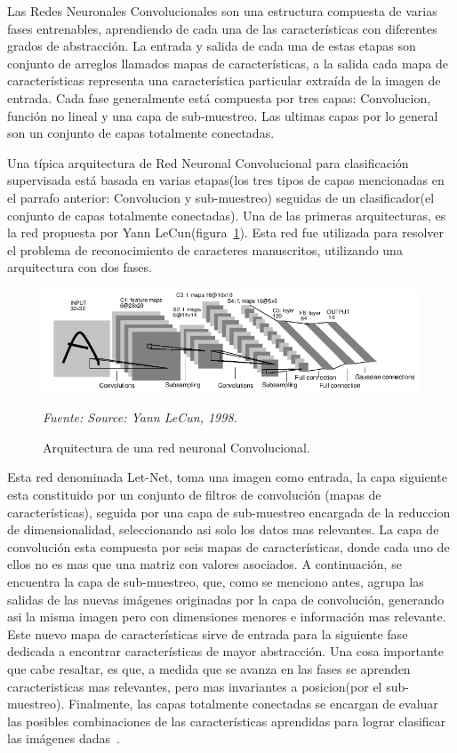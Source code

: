 Las Redes Neuronales Convolucionales son una estructura compuesta de varias fases entrenables, aprendiendo de cada una de las características con diferentes grados de abstracción. La entrada y salida de cada una de estas etapas son conjunto de arreglos llamados mapas de características, a la salida cada mapa de características representa una característica particular extraída de la imagen de entrada. Cada fase generalmente está compuesta por tres capas: Convolucion, función no lineal y una capa de sub-muestreo. Las ultimas capas por lo general son un conjunto de capas totalmente conectadas.

Una típica arquitectura de Red Neuronal Convolucional para clasificación supervisada está basada en varias etapas(los tres tipos de capas mencionadas en el parrafo anterior: Convolucion y sub-muestreo) seguidas de un clasificador(el conjunto de capas totalmente conectadas). Una de las primeras arquitecturas, es la red propuesta por Yann LeCun(figura~\ref{fig:arquitectura_CNN_Lecun}). Esta red fue utilizada para resolver el problema de reconocimiento de caracteres manuscritos, utilizando una arquitectura con dos fases.


\begin{figure}[H]
		\centering
		\includegraphics[width=160mm]{Imagenes/arquitectura_CNN_Lecun.png}
		\caption{Arquitectura de una red neuronal Convolucional.}
		\vspace{0.15cm}
		\textit{Fuente: Source: Yann LeCun, 1998.}
		\label{fig:arquitectura_CNN_Lecun}
\end{figure}

Esta red denominada Let-Net, toma una imagen como entrada, la capa siguiente esta constituido por un conjunto de filtros de convolución (mapas de características), seguida por una capa de sub-muestreo encargada de la reduccion de dimensionalidad, seleccionando asi solo los datos mas relevantes. La capa de convolución esta compuesta por seis mapas de características, donde cada uno de ellos no es mas que una matriz con valores asociados. A continuación, se encuentra la capa de sub-muestreo, que, como se menciono antes, agrupa las salidas de las nuevas imágenes originadas por la capa de convolución, generando asi la misma imagen pero con dimensiones menores e información mas relevante. Este nuevo mapa de características sirve de entrada para la siguiente fase dedicada a encontrar características de mayor abstracción. Una cosa importante que cabe resaltar, es que, a medida que se avanza en las fases se aprenden caracteristicas mas relevantes, pero mas invariantes a posicion(por el sub-muestreo). Finalmente, las capas totalmente conectadas se encargan de evaluar las posibles combinaciones de las características aprendidas para lograr clasificar las imágenes dadas~\cite{16pusiol2014redes}.

